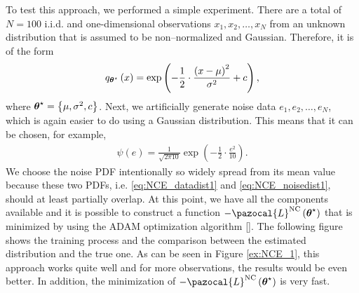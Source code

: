 To test this approach, we performed a simple experiment. There are a total of $N = 100$ i.i.d. and one-dimensional observations $x_1,x_2,\dots,x_N$ from an unknown distribution that is assumed to be non--normalized and Gaussian. Therefore, it is of the form
\begin{align}\label{eq:NCE_datadist1}
    q_{\boldsymbol{\theta}^\star}\left(x\right) = \exp\left(-\frac{1}{2}\cdot\frac{\left(x-\mu\right)^2}{\sigma^2} + c \right),
\end{align} 
where $\boldsymbol{\theta}^\star = \left\lbrace \mu, \sigma^2, c \right\rbrace$. Next, we artificially generate noise data $e_1,e_2,\dots,e_N$, which is again easier to do using a Gaussian distribution. This means that it can be chosen, for example,
\begin{align}\label{eq:NCE_noisedist1}
    \psi\left(e\right) = \frac{1}{\sqrt{2\pi 10}}\exp\left(-\frac{1}{2}\cdot\frac{e^2}{10} \right).
\end{align}
We choose the noise PDF intentionally so widely spread from its mean value because these two PDFs, i.e. \eqref{eq:NCE_datadist1} and \eqref{eq:NCE_noisedist1}, should at least partially overlap. At this point, we have all the components available and it is possible to construct a function $-\pazocal{L}^{\mathrm{NC}}\left(\bt^\star\right)$ that is minimized by using the ADAM optimization algorithm []. The following figure shows the training process and the comparison between
the estimated distribution and the true one. As can be seen in Figure \ref{ex:NCE_1}, this approach works quite well and for more observations, the results would be even better. In addition, the minimization of $-\pazocal{L}^{\mathrm{NC}}\left(\bt^\star\right)$ is very fast.


